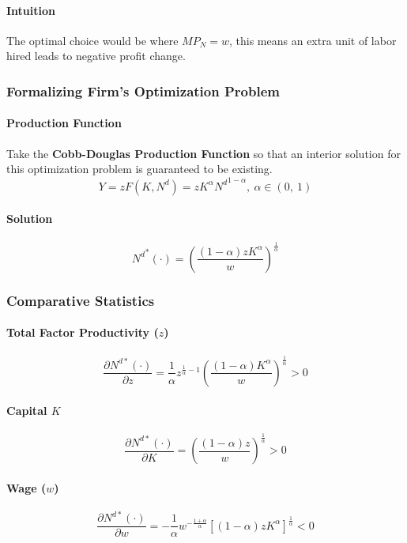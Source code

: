 \documentclass[11pt]{article}
\newcommand{\pd}[2]{\frac{\partial{#1}}{\partial{#2}}}
\begin{document}
\paragraph{Intuition} The optimal choice would be where $MP_N = w$, this means an extra unit of labor hired leads to negative profit change.
\subsubsection{Formalizing Firm's Optimization Problem}
\paragraph{Production Function} Take the \textbf{Cobb-Douglas Production Function} so that an interior solution for this optimization problem is guaranteed to be existing.
\begin{equation}
	Y = zF(K, N^d) = z K ^ \alpha {N^d}^{1-\alpha},\ \alpha \in (0,\ 1)
\end{equation}
\paragraph{Solution}
\begin{equation}
	{N^d}^*(\cdot) = (\frac{(1-\alpha)z K^\alpha}{w})^{\frac{1}{\alpha}}
\end{equation}

\subsubsection{Comparative Statistics}
\paragraph{Total Factor Productivity ($z$)}
\begin{equation}
	\pd{N^{d*}(\cdot)}{z} = \frac{1}{\alpha} z^{\frac{1}{\alpha} - 1} (\frac{(1-\alpha)K^\alpha}{w})^{\frac{1}{\alpha}} > 0
\end{equation}
\paragraph{Capital $K$}
\begin{equation}
	\pd{N^{d*}(\cdot)}{K} = (\frac{(1-\alpha)z}{w})^{\frac{1}{\alpha}} > 0
\end{equation}
\paragraph{Wage ($w$)}
\begin{equation}
	\pd{N^{d*}(\cdot)}{w} = -\frac{1}{\alpha} w ^ {-\frac{1+\alpha}{\alpha}} [(1-\alpha)z K^\alpha]^{\frac{1}{\alpha}} < 0
\end{equation}
\end{document}
